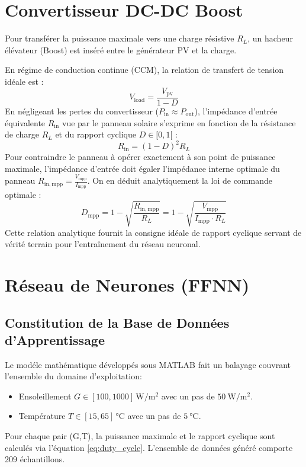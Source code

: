 \documentclass[11pt,a4paper]{article}
\begin{document}
\section{Convertisseur DC-DC Boost}

Pour transférer la puissance maximale vers une charge résistive $R_L$, un hacheur élévateur (Boost) est inséré entre le générateur PV et la charge.

En régime de conduction continue (CCM), la relation de transfert de tension idéale est :
\begin{equation}
    V_{\mathrm{load}} = \frac{V_{\mathrm{pv}}}{1 - D}
\end{equation}
En négligeant les pertes du convertisseur ($P_{\mathrm{in}} \approx P_{\mathrm{out}}$), l'impédance d'entrée équivalente $R_{\mathrm{in}}$ vue par le panneau solaire s'exprime en fonction de la résistance de charge $R_L$ et du rapport cyclique $D \in [0, 1[$ :
\begin{equation}
    R_{\mathrm{in}} = (1 - D)^2 R_L
    \label{eq:impedance}
\end{equation}
Pour contraindre le panneau à opérer exactement à son point de puissance maximale, l'impédance d'entrée doit égaler l'impédance interne optimale du panneau $R_{\mathrm{in,mpp}} = \frac{V_{\mathrm{mpp}}}{I_{\mathrm{mpp}}}$. On en déduit analytiquement la loi de commande optimale :
\begin{equation}
    D_{\mathrm{mpp}} = 1 - \sqrt{\frac{R_{\mathrm{in,mpp}}}{R_L}} = 1 - \sqrt{\frac{V_{\mathrm{mpp}}}{I_{\mathrm{mpp}} \cdot R_L}}
    \label{eq:duty_cycle}
\end{equation}
Cette relation analytique fournit la consigne idéale de rapport cyclique servant de vérité terrain pour l'entraînement du réseau neuronal.
  
\section{Réseau de Neurones (FFNN)}

\subsection{Constitution de la Base de Données d'Apprentissage}
Le modéle mathématique développés sous MATLAB fait un balayage couvrant l'ensemble du domaine d'exploitation:

\begin{itemize}
    \item Ensoleillement $G \in [100, 1000]\,\si{\watt\per\meter\squared}$ avec un pas de $\SI{50}{\watt\per\meter\squared}$.
    \item Température $T \in [15, 65]\,\si{\celsius}$ avec un pas de $\SI{5}{\celsius}$.
\end{itemize}
Pour chaque pair (G,T), la puissance maximale et le rapport cyclique sont calculés via l'équation \ref{eq:duty_cycle}. L'ensemble de données généré comporte 209 échantillons.
\end{document}
